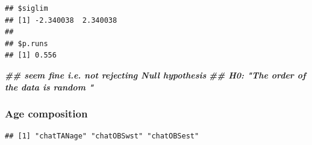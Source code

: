\documentclass[
]{book}
\newenvironment{Shaded}{\begin{snugshade}}{\end{snugshade}}
\newcommand{\DocumentationTok}[1]{\textcolor[rgb]{0.56,0.35,0.01}{\textbf{\textit{#1}}}}
\newcommand{\FunctionTok}[1]{\textcolor[rgb]{0.00,0.00,0.00}{#1}}
\newcommand{\NormalTok}[1]{#1}
\newcommand{\OtherTok}[1]{\textcolor[rgb]{0.56,0.35,0.01}{#1}}
\newcommand{\SpecialCharTok}[1]{\textcolor[rgb]{0.00,0.00,0.00}{#1}}
\begin{document}
\begin{verbatim}
## $siglim
## [1] -2.340038  2.340038
## 
## $p.runs
## [1] 0.556
\end{verbatim}

\begin{Shaded}
\begin{Highlighting}[]
\DocumentationTok{\#\# seem fine i.e. not rejecting Null hypothesis }
\DocumentationTok{\#\# H0: "The order of the data is random "}
\end{Highlighting}
\end{Shaded}

\hypertarget{age-composition}{%
\subsubsection*{Age composition}\label{age-composition}}

\begin{Shaded}
\end{Shaded}

\begin{verbatim}
## [1] "chatTANage" "chatOBSwst" "chatOBSest"
\end{verbatim}
\end{document}
